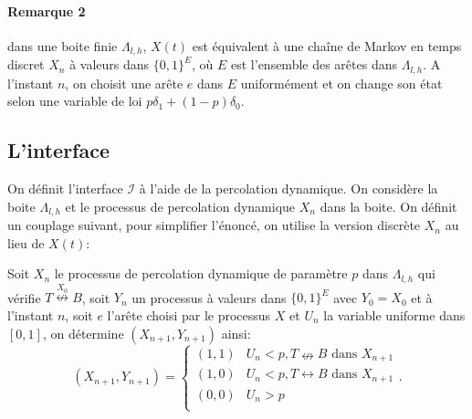 \documentclass[titlepage,a4paper,11pt]{article}
\newcommand{\connect}{\leftrightarrow}
\newcommand{\nconnect}{\nleftrightarrow}
\begin{document}
\paragraph{Remarque 2} dans une boite finie $\Lambda_{l,h}$,  $X(t)$ est équivalent à une chaîne de Markov en temps discret $X_n$ à valeurs dans $\{0,1\}^E$, où $E$ est l'ensemble des arêtes dans $\Lambda_{l,h}$. A l'instant $n$, on choisit une arête $e$ dans $E$ uniformément et on change son état selon une variable de loi $p\delta_1 +(1-p)\delta_0$. 

\subsection{L'interface}
On définit l'interface $\mathcal{I}$ à l'aide de la percolation dynamique. On considère la boite $\Lambda_{l,h}$ et le processus de percolation dynamique $X_n$ dans la boite. On définit un couplage suivant, pour simplifier l'énoncé, on utilise la version discrète $X_n$ au lieu de $X(t)$:

Soit $X_n$ le processus de percolation dynamique de paramètre $p$ dans $\Lambda_{l,h}$ qui vérifie $T\overset{X_0}{\nconnect}B$, soit $Y_n$ un processus à valeurs dans $\{0,1\}^E$ avec $Y_0=X_0$ et à l'instant $n$, soit $e$ l'arête choisi par le processus $X$ et $U_n$ la variable uniforme dans $[0,1]$, on détermine $(X_{n+1},Y_{n+1})$ ainsi:
$$(X_{n+1},Y_{n+1})=\left\lbrace \begin{array}{cc}
(1,1) & U_n<p,T\nconnect B \text{ dans } X_{n+1}\\
(1,0) & U_n<p,T\connect B \text{ dans } X_{n+1} \\
(0,0) & U_n>p\\
\end{array}\right..$$
\end{document}
